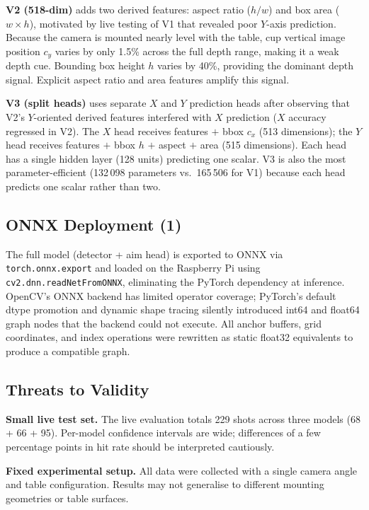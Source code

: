 \documentclass[conference]{IEEEtran}
\begin{document}
\textbf{V2 (518-dim)} adds two derived features: aspect ratio ($h/w$) and
box area ($w{\times}h$), motivated by live testing of V1 that revealed poor
$Y$-axis prediction.  Because the camera is mounted nearly level with the
table, cup vertical image position $c_y$ varies by only 1.5\% across the full
depth range, making it a weak depth cue.  Bounding box height $h$ varies by
40\%, providing the dominant depth signal.  Explicit aspect ratio and area
features amplify this signal.

\textbf{V3 (split heads)} uses separate $X$ and $Y$ prediction heads after
observing that V2's $Y$-oriented derived features interfered with $X$
prediction ($X$ accuracy regressed in V2).  The $X$ head receives features $+$
bbox $c_x$ (513 dimensions); the $Y$ head receives features $+$ bbox $h$ $+$
aspect $+$ area (515 dimensions).  Each head has a single hidden layer
(128 units) predicting one scalar.  V3 is also the most parameter-efficient
(132\,098 parameters vs.\ 165\,506 for V1) because each head predicts one
scalar rather than two.

\subsection{ONNX Deployment (1)}

The full model (detector + aim head) is exported to ONNX via
\texttt{torch.onnx.export} and loaded on the Raspberry Pi using
\texttt{cv2.dnn.readNetFromONNX}, eliminating the PyTorch dependency at
inference.  OpenCV's ONNX backend has limited operator coverage; PyTorch's
default dtype promotion and dynamic shape tracing silently introduced int64
and float64 graph nodes that the backend could not execute.  All anchor
buffers, grid coordinates, and index operations were rewritten as static
float32 equivalents to produce a compatible graph.

\subsection{Threats to Validity}

\textbf{Small live test set.}  The live evaluation totals 229 shots across
three models (68 + 66 + 95).  Per-model confidence intervals are wide;
differences of a few percentage points in hit rate should be interpreted
cautiously.

\textbf{Fixed experimental setup.}  All data were collected with a single
camera angle and table configuration.  Results may not generalise to different
mounting geometries or table surfaces.
\end{document}
